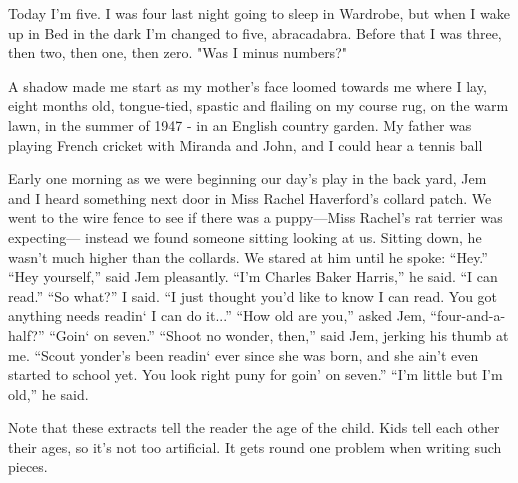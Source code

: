 \documentclass[11pt]{article}
\newenvironment{narrow}[2]{%
 \begin{list}{}{%
  \setlength{\topsep}{0pt}%
  \setlength{\leftmargin}{#1}%
  \setlength{\rightmargin}{#2}%
  \setlength{\listparindent}{\parindent}%
  \setlength{\itemindent}{\parindent}%
  \setlength{\parsep}{\parskip}%
 }%
\item[]}{\end{list}}
\begin{document}
\begin{itemize}
\item 
\begin{narrow}{1.0cm}{1.0cm}
Today I'm five. I was four last night going to sleep in Wardrobe, but when I 
wake up in Bed in the dark I'm changed to five, abracadabra. Before that I was 
three, then two, then one, then zero.
"Was I minus numbers?"
\end{narrow}


\item 
\begin{narrow}{1.0cm}{1.0cm}
A shadow made me start as my mother's face loomed towards me where I lay, eight months old, tongue-tied, spastic and flailing on my course rug, on the warm lawn, in the summer of 1947 - in an English country garden. My father was playing French cricket with Miranda and John, and I could hear a tennis ball

\end{narrow}




\item 
\begin{narrow}{1.0cm}{1.0cm}
Early one morning as we were beginning our day’s play in the back yard, Jem and I
heard something next door in Miss Rachel Haverford’s collard patch. We went to the
wire fence to see if there was a puppy—Miss Rachel’s rat terrier was expecting—
instead we found someone sitting looking at us. Sitting down, he wasn’t much higher
than the collards. We stared at him until he spoke:
“Hey.”
“Hey yourself,” said Jem pleasantly.
“I’m Charles Baker Harris,” he said. “I can read.”
“So what?” I said.
“I just thought you’d like to know I can read. You got anything needs readin‘ I can do
it...”
“How old are you,” asked Jem, “four-and-a-half?”
“Goin‘ on seven.”
“Shoot no wonder, then,” said Jem, jerking his thumb at me. “Scout yonder’s been
readin‘ ever since she was born, and she ain’t even started to school yet. You look right
puny for goin’ on seven.”
“I’m little but I’m old,” he said.

\end{narrow}

\end{itemize}

Note that these extracts tell the reader the age of the child. Kids tell each other their ages, so it's not too artificial. It gets round one problem when writing such pieces.
\end{document}
